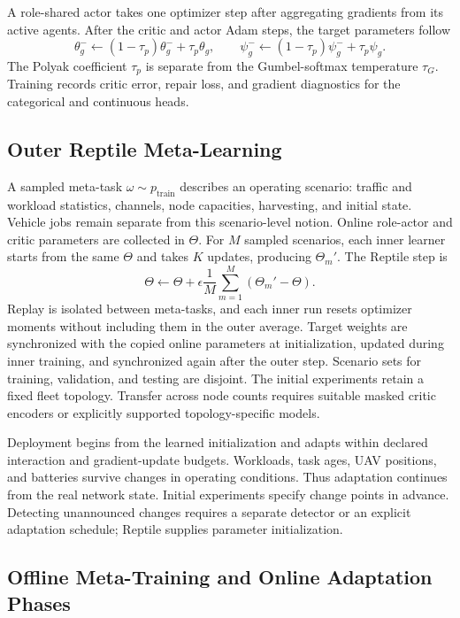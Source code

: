 \documentclass[journal]{IEEEtran}
\begin{document}
A role-shared actor takes one optimizer step after aggregating gradients from its active agents. After the critic and actor Adam steps, the target parameters follow
\begin{equation}
\theta_g^-\leftarrow(1-\tau_p)\theta_g^-+\tau_p\theta_g,\qquad
\psi_g^-\leftarrow(1-\tau_p)\psi_g^-+\tau_p\psi_g.
\label{eq:polyak}
\end{equation}
The Polyak coefficient $\tau_p$ is separate from the Gumbel-softmax
temperature $\tau_G$. Training records critic error, repair loss, and
gradient diagnostics for the categorical and continuous heads.

\subsection{Outer Reptile Meta-Learning}
A sampled meta-task $\omega\sim p_{\mathrm{train}}$ describes an operating scenario: traffic and workload statistics, channels, node capacities, harvesting, and initial state. Vehicle jobs remain separate from this scenario-level notion. Online role-actor and critic parameters are collected in $\Theta$. For $M$ sampled scenarios, each inner learner starts from the same $\Theta$ and takes $K$ updates, producing $\Theta_m'$. The Reptile step is
\begin{equation}
\Theta\leftarrow\Theta+\epsilon\frac1M
 \sum_{m=1}^{M}(\Theta_m'-\Theta).
\label{eq:reptile}
\end{equation}
Replay is isolated between meta-tasks, and each inner run resets optimizer moments without including them in the outer average. Target weights are synchronized with the copied online parameters at initialization, updated during inner training, and synchronized again after the outer step. Scenario sets for training, validation, and testing are disjoint. The initial experiments retain a fixed fleet topology. Transfer across node counts requires suitable masked critic encoders or explicitly supported topology-specific models.

Deployment begins from the learned initialization and adapts within declared interaction and gradient-update budgets. Workloads, task ages, UAV positions, and batteries survive changes in operating conditions. Thus adaptation continues from the real network state. Initial experiments specify change points in advance. Detecting unannounced changes requires a separate detector or an explicit adaptation schedule; Reptile supplies parameter initialization.

\subsection{Offline Meta-Training and Online Adaptation Phases}
\end{document}
